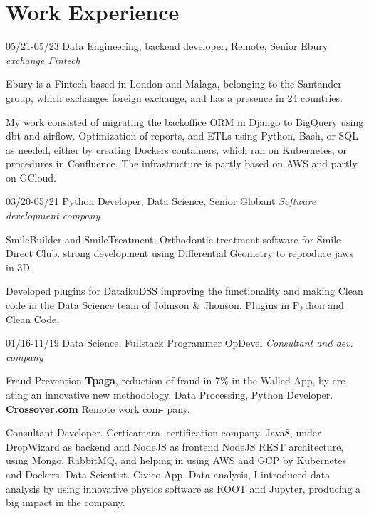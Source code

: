 \section{Work Experience}

\begin{entrylist}
  \entry
    {05/21-05/23}       
    {Data Engineering, backend developer, Remote, Senior}
    {Ebury {\sl exchange Fintech}}
    {Ebury is a Fintech based in London and Malaga, belonging to the Santander group, which exchanges
foreign exchange, and has a presence in 24 countries.

My work consisted of migrating the backoffice ORM in Django to BigQuery using dbt and airflow. Optimization of reports, and ETLs
using Python, Bash, or SQL as needed, either by creating Dockers containers, which ran on Kubernetes, or procedures in Confluence.
The infrastructure is partly based on AWS and partly on GCloud.}
  \entry
    {03/20-05/21}
    {Python Developer, Data Science, Senior}
    {Globant {\sl Software development company}}
    {SmileBuilder and SmileTreatment; Orthodontic treatment software for Smile Direct Club. strong development using Differential Geometry to reproduce jaws in 3D.

Developed plugins for DataikuDSS improving the functionality and making
Clean code in the Data Science team of Johnson \& Jhonson. Plugins in Python and Clean Code.}
  \entry
    {01/16-11/19}
    {Data Science, Fullstack Programmer}
    {OpDevel {\sl Consultant and dev. company}}
    {Fraud Prevention \textbf{Tpaga}, reduction of fraud in 7\% in the Walled App, by cre-
ating an innovative new methodology. Data Processing, Python Developer. \textbf{Crossover.com} Remote work com-
pany.

Consultant Developer. Certicamara, certification company. Java8, under
DropWizard as backend and NodeJS as frontend NodeJS REST architecture,
using Mongo, RabbitMQ, and helping in using AWS and GCP by Kubernetes
and Dockers. Data Scientist. Civico App. Data analysis, I introduced data analysis by using
innovative physics software as ROOT and Jupyter, producing a big impact in
the company.
}
\end{entrylist}
\newpage



